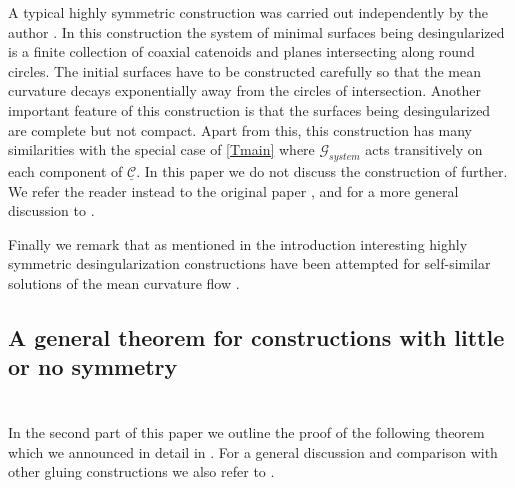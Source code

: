 \documentclass[12pt,namelimits,sumlimits]{amsart}
\theoremstyle{remark}
\numberwithin{equation}{section}
\begin{document}
A typical highly symmetric construction was carried out independently by the author \cite{kapouleas:finite}.
In this construction the system of minimal surfaces being desingularized is a finite collection
of coaxial catenoids and planes intersecting along round circles.
The initial surfaces have to be constructed carefully so that the mean curvature decays exponentially away
from the circles of intersection.
Another important feature of this construction is that the surfaces being desingularized are complete but not compact.
Apart from this, this construction has many similarities with the special case of \ref{Tmain} where ${{\mathscr{G}_{system}}}$
acts transitively on each component of ${\underline{{\mathcal{C}}}}$.
In this paper we do not discuss the construction of \cite{kapouleas:finite} further.
We refer the reader instead to the original paper \cite{kapouleas:finite},
and for a  more general discussion to \cite{kapouleas:survey}.

Finally we remark that as mentioned in the introduction
interesting highly symmetric desingularization constructions have been attempted
for self-similar solutions of the mean curvature flow \cite{nguyen1,nguyen2,nguyen3,nguyen4}.

\subsection*{A general theorem for constructions with little or no symmetry}
$\phantom{ab}$
\nopagebreak

In the second part of this paper we outline the proof of the
following theorem which we announced in detail in \cite[Theorem F]{kapouleas:survey}.
For a general discussion and comparison with other gluing constructions
we also refer to \cite{kapouleas:survey}.
\end{document}
